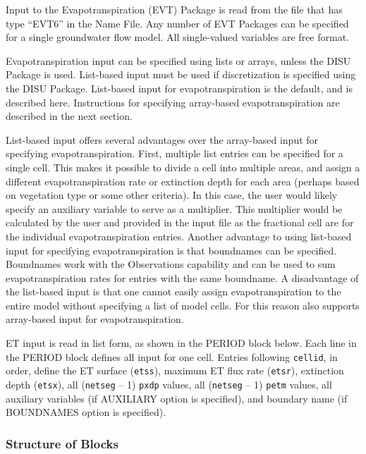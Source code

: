 Input to the Evapotranspiration (EVT) Package is read from the file that has type ``EVT6'' in the Name File. Any number of EVT Packages can be specified for a single groundwater flow model. All single-valued variables are free format.

Evapotranspiration input can be specified using lists or arrays, unless the DISU Package is used.  List-based input must be used if discretization is specified using the DISU Package.  List-based input for evapotranspiration is the default, and is described here.  Instructions for specifying array-based evapotranspiration are described in the next section. 

List-based input offers several advantages over the array-based input for specifying evapotranspiration.  First, multiple list entries can be specified for a single cell.  This makes it possible to divide a cell into multiple areas, and assign a different evapotranspiration rate or extinction depth for each area (perhaps based on vegetation type or some other criteria).  In this case, the user would likely specify an auxiliary variable to serve as a multiplier.  This multiplier would be calculated by the user and provided in the input file as the fractional cell are for the individual evapotranspiration entries.  Another advantage to using list-based input for specifying evapotranspiration is that boundnames can be specified.  Boundnames work with the Observations capability and can be used to sum evapotranspiration rates for entries with the same boundname.  A disadvantage of the list-based input is that one cannot easily assign evapotranspiration to the entire model without specifying a list of model cells.  For this reason \mf also supports array-based input for evapotranspiration.

ET input is read in list form, as shown in the PERIOD block below. Each line in the PERIOD block defines all input for one cell. Entries following \texttt{cellid}, in order, define the ET surface (\texttt{etss}), maximum ET flux rate (\texttt{etsr}), extinction depth (\texttt{etsx}), all (\texttt{netseg} -- 1) \texttt{pxdp} values, all (\texttt{netseg} -- 1) \texttt{petm} values, all auxiliary variables (if AUXILIARY option is specified), and boundary name (if BOUNDNAMES option is specified).

\vspace{5mm}
\subsubsection{Structure of Blocks}
\vspace{5mm}

